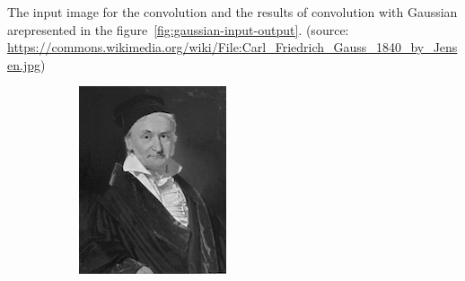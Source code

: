 \documentclass[]{article}
\begin{document}
The input image for the convolution and the results of convolution with Gaussian
arepresented in the figure~\ref{fig:gaussian-input-output}. (source:
\url{https://commons.wikimedia.org/wiki/File:Carl_Friedrich_Gauss_1840_by_Jensen.jpg})
\begin{figure}
  \label{fig:gaussian-input-output}
  \centering
    \begin{subfigure}[t]{0.49\textwidth}
      \centering
      \includegraphics[width=0.99\linewidth]{input.png}
    \end{subfigure}
    \begin{subfigure}[t]{0.49\textwidth}
      \centering

\end{subfigure}
\end{figure}
\end{document}
